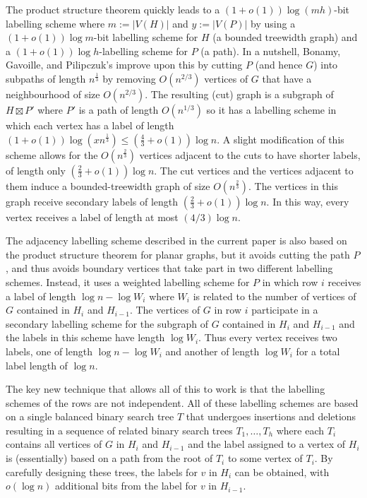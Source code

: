 \documentclass[kpfonts]{patmorin}
\begin{document}
The product structure theorem quickly leads to a $(1+o(1))\log(mh)$-bit labelling scheme where $m:=|V(H)|$ and $y:=|V(P)|$ by using a $(1+o(1))\log m$-bit labelling scheme for $H$ (a bounded treewidth graph) and a $(1+o(1))\log h$-labelling scheme for $P$ (a path).  In a nutshell, Bonamy, Gavoille, and Pilipczuk's improve upon this by cutting $P$ (and hence $G$) into subpaths of length $n^{\tfrac13}$ by removing $O(n^{2/3})$ vertices of $G$ that have a neighbourhood of size $O(n^{2/3})$. The resulting (cut) graph is a subgraph of $H\boxtimes P'$ where $P'$ is a path of length $O(n^{1/3})$ so it has a labelling scheme in which each vertex has a label of length $(1+o(1))\log (xn^{\tfrac13})\le (\tfrac43+o(1))\log n$.  A slight modification of this scheme allows for the $O(n^{\tfrac23})$ vertices adjacent to the cuts to have shorter labels, of length only $(\tfrac23+o(1))\log n$.  The cut vertices and the vertices adjacent to them induce a bounded-treewidth graph of size $O(n^{\tfrac23})$.  The vertices in this graph receive secondary labels of length $(\tfrac23+o(1))\log n$.  In this way, every vertex receives a label of length at most $(4/3)\log n$.

The adjacency labelling scheme described in the current paper is also based on the product structure theorem for planar graphs, but it avoids cutting the path $P$, and thus avoids boundary vertices that take part in two different labelling schemes.  Instead, it uses a weighted labelling scheme for $P$ in which row $i$ receives a label of length $\log n-\log W_i$ where $W_i$ is related to the number of vertices of $G$ contained in $H_i$ and $H_{i-1}$.  The vertices of $G$ in row $i$ participate in a secondary labelling scheme for the subgraph of $G$ contained in $H_i$ and $H_{i-1}$ and the labels in this scheme have length $\log W_i$. Thus every vertex receives two labels, one of length $\log n-\log W_i$ and another of length $\log W_i$ for a total label length of $\log n$.  

The key new technique that allows all of this to work is that the labelling schemes of the rows are not independent.  All of these labelling schemes are based on a single balanced binary search tree $T$ that undergoes insertions and deletions resulting in a sequence of related binary search trees $T_1,\ldots,T_h$ where each $T_i$ contains all vertices of $G$ in $H_{i}$ and $H_{i-1}$ and the label assigned to a vertex of $H_i$ is (essentially) based on a path from the root of $T_i$ to some vertex of $T_i$.  By carefully designing these trees, the labels for $v$ in $H_i$ can be obtained, with $o(\log n)$ additional bits from the label for $v$ in $H_{i-1}$.  
\end{document}
